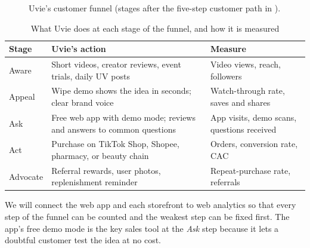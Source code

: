 \begin{figure}[ht]
  \centering
  \caption{Uvie's customer funnel (stages after the five-step customer path in \cite{kotler2017}).}
  \label{fig:funnel}
\end{figure}

\begin{table}[ht]
\centering\small
\caption{What Uvie does at each stage of the funnel, and how it is measured}\label{tab:funnel}
\begin{tabular}{@{}L{1.9cm}L{6.4cm}L{5.9cm}@{}}
  \toprule
  \textbf{Stage} & \textbf{Uvie's action} & \textbf{Measure}\\
  \midrule
  Aware & Short videos, creator reviews, event trials, daily UV posts & Video views, reach, followers\\
  \addlinespace
  Appeal & Wipe demo shows the idea in seconds; clear brand voice & Watch-through rate, saves and shares\\
  \addlinespace
  Ask & Free web app with demo mode; reviews and answers to common questions & App visits, demo scans, questions received\\
  \addlinespace
  Act & Purchase on TikTok Shop, Shopee, pharmacy, or beauty chain & Orders, conversion rate, CAC\\
  \addlinespace
  Advocate & Referral rewards, user photos, replenishment reminder & Repeat-purchase rate, referrals\\
  \bottomrule
\end{tabular}
\end{table}

We will connect the web app and each storefront to web analytics so that every step
of the funnel can be counted and the weakest step can be fixed first. The app's free
demo mode is the key sales tool at the \emph{Ask} step because it lets a doubtful
customer test the idea at no cost.

